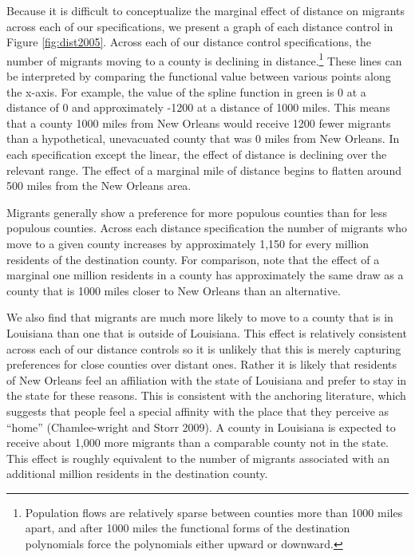 \documentclass[]{article}
\let\rmarkdownfootnote\footnote%
\def\footnote{\protect\rmarkdownfootnote}
\begin{document}
Because it is difficult to conceptualize the marginal effect of distance
on migrants across each of our specifications, we present a graph of
each distance control in Figure \ref{fig:dist2005}. Across each of our
distance control specifications, the number of migrants moving to a
county is declining in distance.\footnote{Population flows are
  relatively sparse between counties more than 1000 miles apart, and
  after 1000 miles the functional forms of the destination polynomials
  force the polynomials either upward or downward.} These lines can be
interpreted by comparing the functional value between various points
along the x-axis. For example, the value of the spline function in green
is 0 at a distance of 0 and approximately -1200 at a distance of 1000
miles. This means that a county 1000 miles from New Orleans would
receive 1200 fewer migrants than a hypothetical, unevacuated county that
was 0 miles from New Orleans. In each specification except the linear,
the effect of distance is declining over the relevant range. The effect
of a marginal mile of distance begins to flatten around 500 miles from
the New Orleans area.

Migrants generally show a preference for more populous counties than for
less populous counties. Across each distance specification the number of
migrants who move to a given county increases by approximately 1,150 for
every million residents of the destination county. For comparison, note
that the effect of a marginal one million residents in a county has
approximately the same draw as a county that is 1000 miles closer to New
Orleans than an alternative.

We also find that migrants are much more likely to move to a county that
is in Louisiana than one that is outside of Louisiana. This effect is
relatively consistent across each of our distance controls so it is
unlikely that this is merely capturing preferences for close counties
over distant ones. Rather it is likely that residents of New Orleans
feel an affiliation with the state of Louisiana and prefer to stay in
the state for these reasons. This is consistent with the anchoring
literature, which suggests that people feel a special affinity with the
place that they perceive as ``home'' (Chamlee-wright and Storr 2009). A
county in Louisiana is expected to receive about 1,000 more migrants
than a comparable county not in the state. This effect is roughly
equivalent to the number of migrants associated with an additional
million residents in the destination county.
\end{document}
